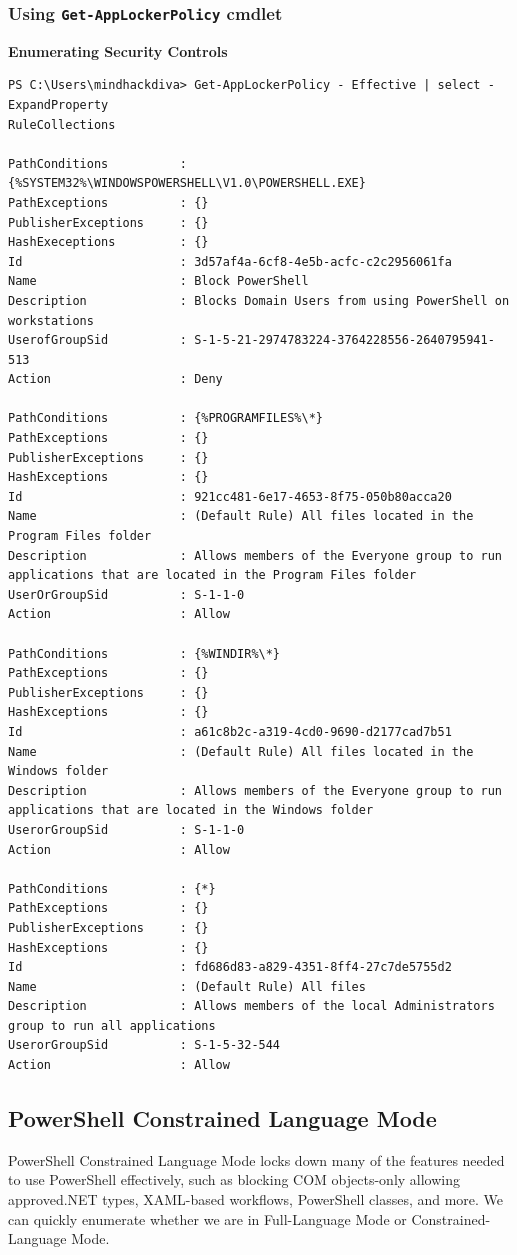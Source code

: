 \subsubsection{Using \texttt{Get-AppLockerPolicy} cmdlet}
\textbf{Enumerating Security Controls}
\begin{notebox}
\begin{verbatim}
PS C:\Users\mindhackdiva> Get-AppLockerPolicy - Effective | select -ExpandProperty
RuleCollections

PathConditions          :{%SYSTEM32%\WINDOWSPOWERSHELL\V1.0\POWERSHELL.EXE}
PathExceptions          : {}
PublisherExceptions     : {}
HashExeceptions         : {}
Id                      : 3d57af4a-6cf8-4e5b-acfc-c2c2956061fa
Name                    : Block PowerShell
Description             : Blocks Domain Users from using PowerShell on workstations
UserofGroupSid          : S-1-5-21-2974783224-3764228556-2640795941-513
Action                  : Deny

PathConditions          : {%PROGRAMFILES%\*}
PathExceptions          : {}
PublisherExceptions     : {}
HashExceptions          : {}
Id                      : 921cc481-6e17-4653-8f75-050b80acca20
Name                    : (Default Rule) All files located in the Program Files folder
Description             : Allows members of the Everyone group to run applications that are located in the Program Files folder
UserOrGroupSid          : S-1-1-0
Action                  : Allow

PathConditions          : {%WINDIR%\*}
PathExceptions          : {}
PublisherExceptions     : {}
HashExceptions          : {}
Id                      : a61c8b2c-a319-4cd0-9690-d2177cad7b51
Name                    : (Default Rule) All files located in the Windows folder
Description             : Allows members of the Everyone group to run applications that are located in the Windows folder
UserorGroupSid          : S-1-1-0
Action                  : Allow

PathConditions          : {*}
PathExceptions          : {}
PublisherExceptions     : {}
HashExceptions          : {}
Id                      : fd686d83-a829-4351-8ff4-27c7de5755d2
Name                    : (Default Rule) All files
Description             : Allows members of the local Administrators group to run all applications
UserorGroupSid          : S-1-5-32-544
Action                  : Allow
\end{verbatim}
\end{notebox}

\subsection{PowerShell Constrained Language Mode}
PowerShell Constrained Language Mode locks down many of the features needed to use PowerShell effectively, such as blocking COM objects-only allowing approved.NET types, XAML-based workflows, PowerShell classes, and more. We can quickly enumerate whether we are in Full-Language Mode or Constrained-Language Mode.
